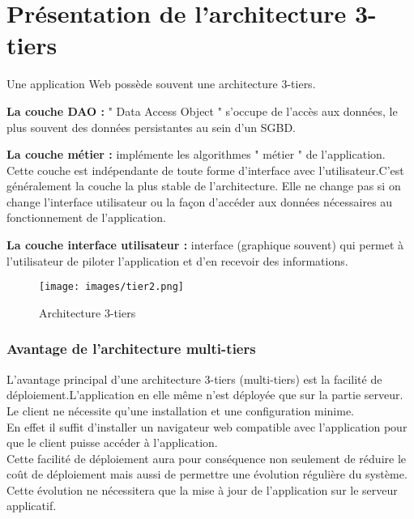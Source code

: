 \documentclass{report}
\begin{document}
\section{Présentation de l’architecture 3-tiers}
Une application Web possède souvent une architecture 3-tiers.\\
\begin{description}
    \item{\textbf{La couche DAO :}} " Data Access Object " s'occupe de l'accès aux données, le plus souvent des données persistantes au sein d'un SGBD.\\
    \item{\textbf{La couche métier :}} implémente les algorithmes " métier " de l'application. Cette couche est indépendante de toute forme d'interface avec l'utilisateur.C'est généralement la couche la plus stable de l'architecture. Elle ne change pas si on change l'interface utilisateur ou la façon d'accéder aux données nécessaires au fonctionnement de l'application.\\
    \item{\textbf{La couche interface utilisateur :}} interface (graphique souvent) qui permet à l'utilisateur de piloter l'application et d'en recevoir des informations.\\
\end{description}

\begin{figure}[h]
        \centering
            \texttt{[image: images/tier2.png]}
        \caption{Architecture 3-tiers}
    \end{figure}

\subsubsection*{Avantage de l'architecture multi-tiers }
L'avantage principal d'une architecture 3-tiers (multi-tiers) est la facilité de déploiement.L'application en elle même n'est déployée que sur la partie serveur.\\Le client ne nécessite qu'une installation et une configuration minime.\\En effet il suffit d'installer un navigateur web compatible avec l'application pour que le client puisse accéder à l'application.\\Cette facilité de déploiement aura pour conséquence non seulement de réduire le coût de déploiement mais aussi de permettre une évolution régulière du système. Cette évolution ne nécessitera que la mise à jour de l'application sur le serveur applicatif.\cite{tier}
\end{document}

